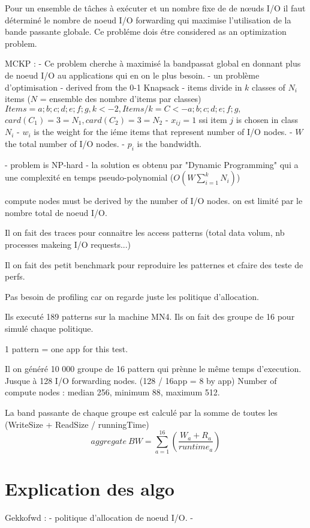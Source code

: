 \documentclass[10pt, a4paper]{article}
\begin{document}
Pour un ensemble de tâches à exécuter et un nombre fixe de de nœuds I/O il faut déterminé le nombre de noeud I/O forwarding qui maximise l'utilisation de la bande passante globale. Ce probléme dois étre considered as an optimization problem.

MCKP :
- Ce problem cherche à maximisé la bandpassat global en donnant plus de noeud I/O au applications qui en on le plus besoin.
- un problème d'optimisation
- derived from the 0-1 Knapsack
- items divide in $k$ classes of $N_i$ items
($N$ = ensemble des nombre d'items par classes)
$Items = {a; b; c; d; e; f; g}, k <- 2, Items/k = C <- {{a; b; c}; {d; e; f; g}},$
$card(C_1) = 3 = N_1, card(C_2) = 3 = N_2$
- $x_{ij} = 1$ ssi item $j$ is chosen in class $N_i$
- $w_i$ is the weight for the iéme items that represent number of I/O nodes.
- $W$ the total number of I/O nodes.
- $p_i$ is the bandwidth.

- problem is NP-hard
- la solution es obtenu par "Dynamic Programming" qui a une complexité en temps pseudo-polynomial ($O(W\sum^{k}_{i=1}N_i)$)


compute nodes must be derived by the number of I/O nodes.
on est limité par le nombre total de noeud I/O.

Il on fait des traces pour connaitre les access patterns (total data volum, nb processes makeing I/O requests...)

Il on fait des petit benchmark pour reproduire les patternes et cfaire des teste de perfs.

Pas besoin de profiling car on regarde juste les politique d'allocation.

Ils executé 189 patterns sur la machine MN4.
Ils on fait des groupe de 16 pour simulé chaque politique.

1 pattern = one app for this test.

Il on généré 10 000 groupe de 16 pattern qui prènne le même temps d'execution.
Jusque à 128 I/O forwarding nodes. (128 / 16app = 8 by app)
Number of compute nodes : median 256, minimum 88, maximum 512.

La band passante de chaque groupe est calculé par la somme de toutes les (WriteSize + ReadSize / runningTime)
\begin{equation*}aggregate\ BW=\sum_{a=1}^{16}\left(\frac{W_{a}+R_{a}}{runtime_{a}}\right) \tag{2}\end{equation*}

\section{Explication des algo}
Gekkofwd :
- politique d'allocation de noeud I/O.
- 
\end{document}
